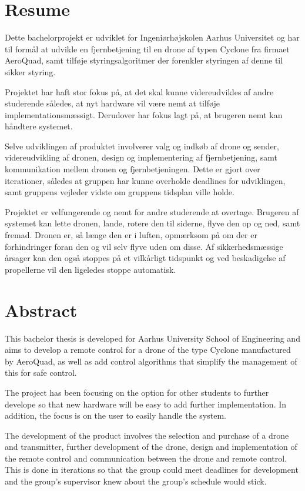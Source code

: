 \documentclass[Main]{subfiles}
\begin{document}
\chapter*{Resume}

Dette bachelorprojekt er udviklet for Ingeniørhøjskolen Aarhus Universitet og har til formål at udvikle en fjernbetjening til en drone af typen Cyclone fra firmaet AeroQuad, samt tilføje styringsalgoritmer der forenkler styringen af denne til sikker styring.

Projektet har haft stor fokus på, at det skal kunne videreudvikles af andre studerende således, at nyt hardware vil være nemt at tilføje implementationsmæssigt.
Derudover har fokus lagt på, at brugeren nemt kan håndtere systemet.

Selve udviklingen af produktet involverer valg og indkøb af drone og sender, videreudvikling af dronen, design og implementering af fjern\-betjening, samt kommunikation mellem dronen og fjernbetjeningen.
Dette er gjort over iterationer, således at gruppen har kunne overholde deadlines for udviklingen, samt gruppens vejleder vidste om gruppens tidsplan ville holde.

Projektet er velfungerende og nemt for andre studerende at overtage.
Brugeren af systemet kan lette dronen, lande, rotere den til siderne, flyve den op og ned, samt fremad.
Dronen er, så længe den er i luften, opmærksom på om der er forhindringer foran den og vil  selv flyve uden om disse.
Af sikkerhedsmæssige årsager kan den også stoppes på et vilkårligt tidspunkt og ved beskadigelse af propellerne vil den ligeledes stoppe automatisk.




\chapter*{Abstract}

This bachelor thesis is developed for Aarhus University School of Engineering and aims to develop a remote control for a drone of the type Cyclone manufactured by AeroQuad, as well as add control algorithms that simplify the management of this for safe control.

The project has been focusing on the option for other students to further develope so that new hardware will be easy to add further implementation.
In addition, the focus is on the user to easily handle the system.

The development of the product involves the selection and purchase of a drone and transmitter,  further development of the drone, design and implementation of the remote control and communication between the drone and remote control.
This is done in iterations so that the group could meet deadlines for development and the group's supervisor knew about the group's schedule would stick.
\end{document}
